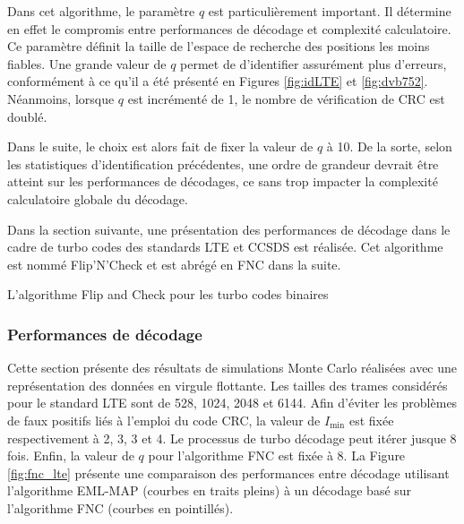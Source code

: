 Dans cet algorithme, le paramètre $q$ est particulièrement important. Il détermine en effet le compromis entre performances
de décodage et complexité calculatoire. Ce paramètre définit la taille de l'espace de recherche des positions les moins
fiables. Une grande valeur de $q$ permet de d'identifier assurément plus d'erreurs, conformément à ce qu'il a été
présenté en Figures \ref{fig:idLTE} et \ref{fig:dvb752}. Néanmoins, lorsque $q$ est incrémenté de 1, le nombre de 
vérification de CRC est doublé.

Dans le suite, le choix est alors fait de fixer la valeur de $q$ à 10. De la sorte, selon les statistiques d'identification 
précédentes, une ordre de grandeur devrait être atteint sur les performances de décodages, ce sans trop impacter la complexité
calculatoire globale du décodage.

Dans la section suivante, une présentation des performances de décodage dans le cadre de turbo codes des standards LTE
et CCSDS est réalisée. Cet algorithme est nommé Flip'N'Check et est abrégé en FNC dans la suite.

\begin{center}
\begin{minipage}{.86\textwidth}%
\begin{algorithm}[H]
\label{alg:fc_b}
	\DontPrintSemicolon
	
	\;
	\caption{L'algorithme Flip and Check pour les turbo codes binaires}
\end{algorithm}
\end{minipage}
\end{center}



\subsubsection{Performances de décodage}
Cette section présente des résultats de simulations Monte Carlo réalisées avec une représentation des données en 
virgule flottante.
Les tailles des trames considérés pour le standard LTE sont de 528, 1024, 2048 et 6144. Afin d'éviter les problèmes de
faux positifs liés à l'emploi du code CRC, la valeur de $I_\text{min}$ est fixée respectivement à 2, 3, 3 et 4. Le processus
de turbo décodage peut itérer jusque 8 fois. Enfin, la valeur de $q$ pour l'algorithme FNC est fixée à 8. La Figure 
\ref{fig:fnc_lte} présente une comparaison des performances entre décodage utilisant l'algorithme EML-MAP (courbes en 
traits pleins) à un décodage basé sur l'algorithme FNC (courbes en pointillés).

